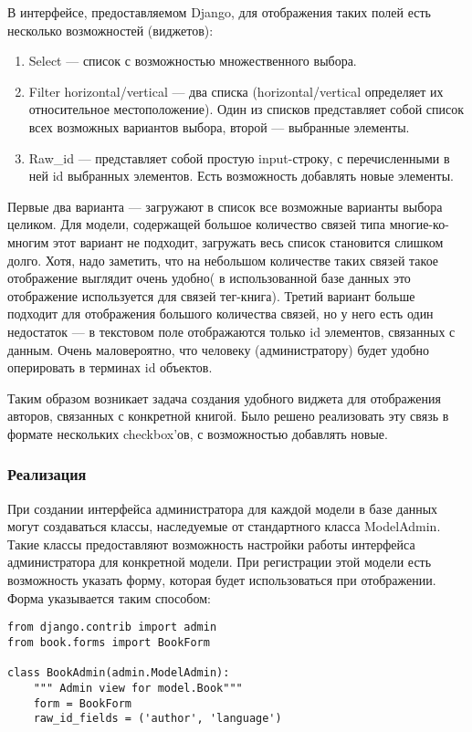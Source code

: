 В интерфейсе, предоставляемом Django, для отображения таких полей есть несколько возможностей (виджетов):
\begin{enumerate}
	\item Select --- список с возможностью множественного выбора.
	\item Filter horizontal/vertical --- два списка (horizontal/vertical определяет их относительное местоположение). Один из списков представляет собой список всех возможных вариантов выбора, второй --- выбранные элементы.
	\item Raw\_id --- представляет собой простую input-строку, с перечисленными в ней id выбранных элементов. Есть возможность добавлять новые элементы.
\end{enumerate}
Первые два варианта --- загружают в список все возможные варианты выбора целиком. Для модели, содержащей большое количество связей типа многие-ко-многим этот вариант не подходит, \tk загружать весь список становится слишком долго. Хотя, надо заметить, что на небольшом количестве таких связей такое отображение выглядит очень удобно( в использованной базе данных это отображение используется для связей тег-книга). 
Третий вариант больше подходит для отображения большого количества связей, но у него есть один недостаток --- в текстовом поле отображаются только id элементов, связанных с данным. Очень маловероятно, что человеку (администратору) будет удобно оперировать в терминах id объектов.

Таким образом возникает задача создания удобного виджета для отображения авторов, связанных с конкретной книгой.
Было решено реализовать эту связь в формате нескольких checkbox'ов, с возможностью добавлять
новые.

\subsubsection{Реализация}

При создании интерфейса администратора для каждой модели в базе данных могут создаваться классы, наследуемые от стандартного класса ModelAdmin. Такие классы предоставляют возможность настройки работы интерфейса администратора для конкретной модели. При регистрации этой модели есть возможность указать форму, которая будет использоваться при отображении. Форма указывается таким способом:

{
\small \begin{verbatim}
from django.contrib import admin
from book.forms import BookForm

class BookAdmin(admin.ModelAdmin):
    """ Admin view for model.Book"""
    form = BookForm
    raw_id_fields = ('author', 'language')
\end{verbatim}
}

